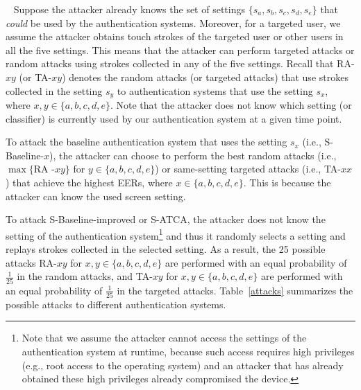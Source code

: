 \documentclass{sig-alternate-05-2015}
\newcommand{\myparatight}[1]{\smallskip\noindent{\bf {#1}:}~}
\begin{document}
\myparatight{Attacks} Suppose 
the attacker already knows the set of
settings $\{s_a,s_b, s_c,s_d,s_e\}$ that \emph{could} be used by the authentication systems.
Moreover, for a targeted user, we assume the attacker obtains touch strokes of
the targeted user or other users in all the five settings. This means
that the attacker can perform targeted attacks or random attacks using strokes
collected in any of the five settings. 
Recall that RA-$xy$ (or TA-$xy$) denotes the random attacks (or targeted attacks) that use
strokes collected in the setting $s_y$ to authentication systems that use
the setting  $s_x$, where $x,y\in\{a,b,c,d,e\}$.  
Note that the attacker does not know which setting (or classifier) is
currently used by our authentication system at a given time point.



To attack the baseline authentication system that uses the setting $s_x$ (i.e.,
S-Baseline-$x$), the attacker can choose to perform the best random attacks
(i.e., $\max\{\text{RA}$
$\text{-}xy\}$ for $y\in\{a,b,c,d,e\}$) or 
same-setting targeted attacks (i.e., TA-$xx$) that achieve the highest EERs,
 where
$x\in\{a,b,c,d,e\}$. This is because the attacker can know the used screen setting.



To attack S-Baseline-improved or S-ATCA, the attacker does not know the setting
of the authentication system\footnote{Note that we assume the attacker cannot
access the settings of the authentication system  at runtime, because such
access requires high privileges (e.g., root access to the operating system) and
an attacker that has already obtained these high privileges already compromised
the device.} and thus it randomly selects a setting and replays
strokes collected in the selected setting. As a result, the 25 possible
attacks RA-$xy$ for $x,y\in \{a,b,c,d,e\}$ are performed with an equal probability
of $\frac{1}{25}$ in the random attacks, and TA-$xy$ for $x,y\in \{a,b,c,d,e\}$ are
performed with an equal probability of $\frac{1}{25}$ in the targeted attacks. 
Table~\ref{attacks} summarizes the possible attacks to different authentication
systems.
\end{document}
